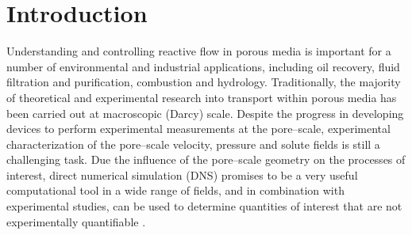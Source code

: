 \documentclass[preprint, 1p, authoryear]{elsarticle}
\begin{document}
\section{Introduction}


Understanding and controlling reactive flow in porous media is important for a number of environmental and industrial applications, including oil recovery, fluid filtration and purification, combustion and hydrology.  Traditionally, the majority  of  theoretical  and experimental research into transport within porous media has been carried out at macroscopic (Darcy) scale.  
Despite the progress in developing devices to perform experimental measurements at the pore--scale, experimental characterization of the pore--scale velocity, pressure and solute fields is still a challenging task. Due the influence of the pore--scale geometry on the processes of interest, direct numerical simulation (DNS) promises to be a very useful computational tool in  a wide range of fields, and in combination with experimental studies, can be used to determine quantities of interest that are not experimentally quantifiable \citep{Blunt2013Porescale}. 
\end{document}
